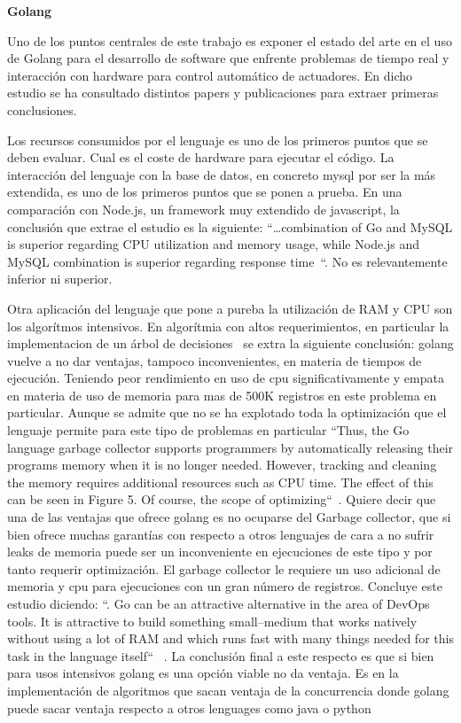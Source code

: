 \textbf{Golang}

Uno de los puntos centrales de este trabajo es exponer el estado del arte en el uso de Golang para el desarrollo de software que enfrente problemas de tiempo real y interacción con hardware para control automático de actuadores. En dicho estudio se ha consultado distintos papers y publicaciones para extraer primeras conclusiones.

Los recursos consumidos por el lenguaje es uno de los primeros puntos que se deben evaluar. Cual es el coste de hardware para ejecutar el código. La interacción del lenguaje con la base de datos, en concreto mysql por ser la más extendida, es uno de los primeros puntos que se ponen a prueba. En una comparación con Node.js, un framework muy extendido de javascript, la conclusión que extrae el estudio es la siguiente: “\ldots combination of Go and MySQL is superior regarding CPU utilization and memory usage, while Node.js and MySQL combination is superior regarding response time~\cite{Effendy20211955}“. No es relevantemente inferior ni superior.

Otra aplicación del lenguaje que pone a pureba la utilización de RAM y CPU son los algorítmos intensivos. En algorítmia con altos requerimientos, en particular la implementacion de un árbol de decisiones~\cite{Dymora20201} se extra la siguiente conclusión: golang vuelve a no dar ventajas, tampoco inconvenientes, en materia de tiempos de ejecución. Teniendo peor rendimiento en uso de cpu significativamente y empata en materia de uso de memoria para mas de 500K registros en este problema en particular. Aunque se admite que no se ha explotado toda la optimización que el lenguaje permite para este tipo de problemas en particular “Thus, the Go language garbage collector supports programmers by automatically releasing their programs memory when it is no longer needed. However, tracking and cleaning the memory requires additional resources such as CPU time. The effect of this can be seen in Figure 5. Of course, the scope of optimizing“~\cite{Dymora20201}. Quiere decir que una de las ventajas que ofrece golang es no ocuparse del Garbage collector, que si bien ofrece muchas garantías con respecto a otros lenguajes de cara a no sufrir leaks de memoria puede ser un inconveniente en ejecuciones de este tipo y por tanto requerir optimización. El garbage collector le requiere un uso adicional de memoria y cpu para ejecuciones con un gran número de registros. Concluye este estudio diciendo: “. Go can be an attractive alternative in the area of DevOps tools. It is attractive to build something small–medium that works natively without using a lot of RAM and which runs fast with many things needed for this task in the language itself“ ~\cite{Dymora20201}. La conclusión final a este respecto es que si bien para usos intensivos golang es una opción viable no da ventaja. Es en la implementación de algoritmos que sacan ventaja de la concurrencia donde golang puede sacar ventaja respecto a otros lenguages como java o python ~\cite{Jenkins201714}

